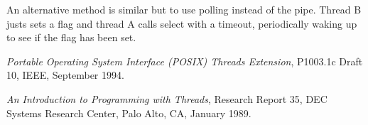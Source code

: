 \documentclass[11pt,twoside,a4paper]{article}
\begin{document}
An alternative method is similar but to use polling instead of the
pipe.  Thread B justs sets a flag and thread A calls select with a
timeout, periodically waking up to see if the flag has been set.


\begin{thebibliography}{lo}

\emph{Portable Operating System Interface (POSIX) Threads Extension},
P1003.1c Draft 10,
IEEE,
September 1994.

\emph{An Introduction to Programming with Threads},
Research Report 35,
DEC Systems Research Center,
Palo Alto, CA,
January 1989.

\end{thebibliography}
\end{document}
